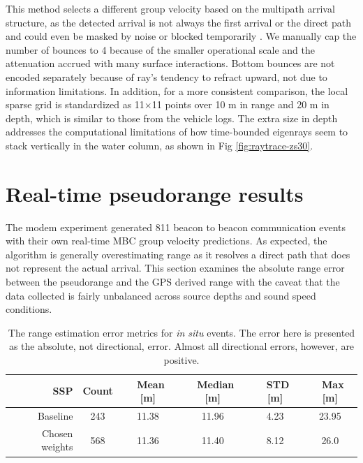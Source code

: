 This method selects a different group velocity based on the multipath arrival structure, as the detected arrival is not always the first arrival or the direct path and could even be masked by noise or blocked temporarily \citep{deffenbaugh_acoustic_1996}.
We manually cap the number of bounces to 4 because of the smaller operational scale and the attenuation accrued with many surface interactions.
Bottom bounces are not encoded separately because of ray's tendency to refract upward, not due to information limitations. 
 In addition, for a more consistent comparison, the local sparse grid is standardized as 11$\times$11 points over 10 m in range and 20 m in depth, which is similar to those from the vehicle logs.
The extra size in depth addresses the computational limitations of how time-bounded eigenrays seem to stack vertically in the water column, as shown in Fig \ref{fig:raytrace-zs30}.


\FloatBarrier
\section{\label{sec:realtime} Real-time pseudorange results}

The modem experiment generated 811 beacon to beacon communication events with their own real-time MBC group velocity predictions.
 As expected, the algorithm is generally overestimating range as it resolves a direct path that does not represent the actual arrival.
This section examines the absolute range error between the pseudorange and the GPS derived range with the caveat that the data collected is fairly unbalanced across source depths and sound speed conditions.

\begin{table}[h!]
\renewcommand{\arraystretch}{1.3}
\centering
\begin{tabular}{r|c|c|c|c|c}
SSP & Count & ~Mean [m] & ~Median [m] & ~STD [m] & ~Max [m] \\ \hline
Baseline & 243 & 11.38 & 11.96 & 4.23 & 23.95 \\ 
Chosen weights & 568 & 11.36 & 11.40 & 8.12 & 26.0 \\
\toprule
\end{tabular}
\caption[Range estimation error for \textit{in situ} events]{The range estimation error metrics for \textit{in situ} events. The error here is presented as the absolute, not directional, error. Almost all directional errors, however, are positive.}
\label{tab:rangeErrorInSitu}
\end{table}

